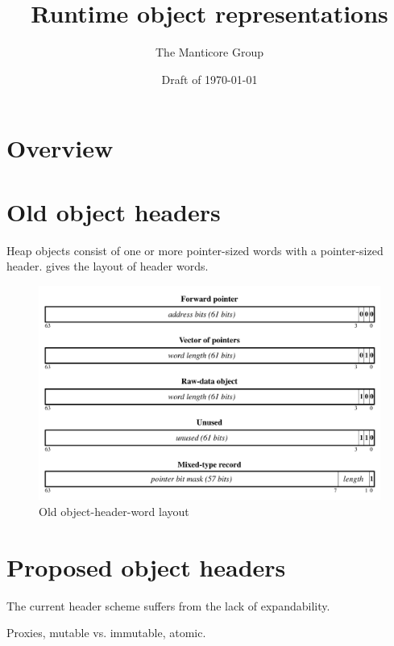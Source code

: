 \documentclass[11pt]{article}
\title{Runtime object representations}
\author{The Manticore Group}
\date{Draft of \today}
\begin{document}
\maketitle

\section{Overview}


\section{Old object headers}
Heap objects consist of one or more pointer-sized words with
a pointer-sized header.
 gives the layout of header words.
\begin{figure}[t]
  \begin{center}
    \includegraphics[width=5in]{pictures/old-object-headers}
  \end{center}%
  \caption{Old object-header-word layout}
  \label{fig:old-object-headers}
\end{figure}%

\section{Proposed object headers}
The current header scheme suffers from the lack of expandability.

Proxies, mutable vs. immutable, atomic.
\end{document}
